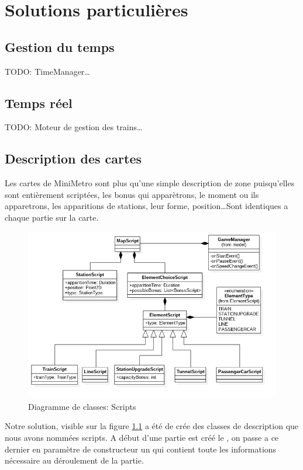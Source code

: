 \documentclass[report, backcover, french, nodocumentinfo]{upmethodology-document}
\begin{document}
	\chapter{Solutions particulières}
		\section{Gestion du temps}
			TODO: TimeManager\ldots
		\section{Temps réel}
			TODO: Moteur de gestion des trains\ldots
		\section{Description des cartes}
				Les cartes de MiniMetro sont plus qu'une simple description de zone puisqu'elles sont entièrement scriptées, les bonus qui apparètrons, le moment ou ils apparetrons, les apparitions de stations, leur forme, position\ldots Sont identiques a chaque partie sur la carte.
				\begin{figure}[h!]
					\centering
					\includegraphics[width=\textwidth]{figures/ScriptsClassDiagram}
					\caption{Diagramme de classes: Scripts}
					\label{fig:ScriptsClassDiagram}
				\end{figure}
				Notre solution, visible sur la figure \ref{fig:ScriptsClassDiagram} a été de crée des classes de description que nous avons nommées scripts. A début d'une partie est créé le , on passe a ce dernier en paramètre de constructeur un  qui contient toute les informations nécessaire au déroulement de la partie.
\end{document}
